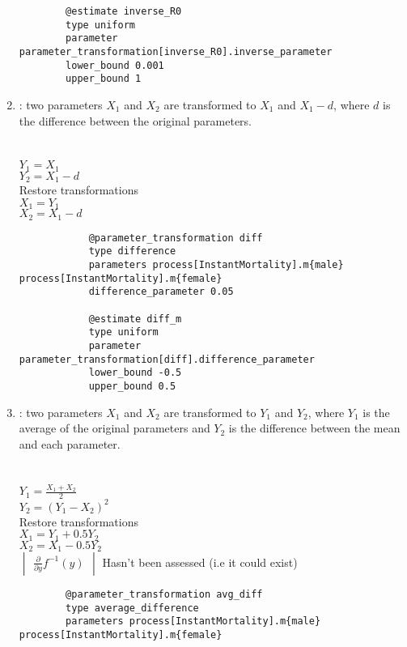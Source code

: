\begin{enumerate}
{{\begin{verbatim}
		@estimate inverse_R0
		type uniform
		parameter parameter_transformation[inverse_R0].inverse_parameter
		lower_bound 0.001
		upper_bound 1
		\end{verbatim}}}
	
\item {} : two parameters $X_1$ and $X_2$ are transformed to $X_1$ and $X_1 - d$, where $d$ is the difference between the original parameters.\\
\\
\\
$Y_1 = X_1$\\
$Y_2 = X_1 - d$\\
Restore transformations\\
$X_1 = Y_1$\\
$X_2 = X_1 - d$\\
\label{sec:Transformation-Difference}
{\small{\begin{verbatim}
			@parameter_transformation diff
			type difference
			parameters process[InstantMortality].m{male} process[InstantMortality].m{female}
			difference_parameter 0.05
			
			@estimate diff_m
			type uniform
			parameter parameter_transformation[diff].difference_parameter
			lower_bound -0.5
			upper_bound 0.5		
\end{verbatim}}}

\item {} : two parameters $X_1$ and $X_2$ are transformed to $Y_1$ and $Y_2$, where $Y_1$ is the average of the original parameters and $Y_2$ is the difference between the mean and each parameter.\\
\\
\\
$Y_1 = \frac{X_1 + X_2}{2}$\\
$Y_2 =  (Y_1 - X_2)^2 $\\
Restore transformations\\
$X_1 = Y_1 + 0.5Y_2$\\
$X_2 = X_1 - 0.5Y_2$\\
$\begin{vmatrix} \frac{\partial}{\partial y} f^{-1}(y) \end{vmatrix}$ Hasn't been assessed (i.e it could exist) \label{sec:Transformation-AverageDifference}
{\small{\begin{verbatim}
		@parameter_transformation avg_diff
		type average_difference
		parameters process[InstantMortality].m{male} process[InstantMortality].m{female}
		

\end{verbatim}}}
\end{enumerate}

